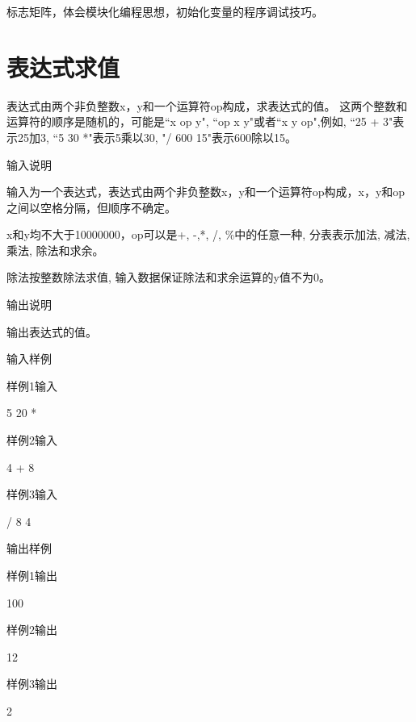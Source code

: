 \begin{note}[要点]
标志矩阵，体会模块化编程思想，初始化变量的程序调试技巧。
\end{note}

\section{表达式求值}
表达式由两个非负整数x，y和一个运算符op构成，求表达式的值。
这两个整数和运算符的顺序是随机的，可能是``x op y", ``op x y"或者``x y op",例如, ``25 + 3"表示25加3, ``5 30 *"表示5乘以30, "/ 600 15"表示600除以15。

输入说明

输入为一个表达式，表达式由两个非负整数x，y和一个运算符op构成，x，y和op之间以空格分隔，但顺序不确定。

x和y均不大于10000000，op可以是+, -,*, /, \%中的任意一种, 分表表示加法, 减法, 乘法, 除法和求余。

除法按整数除法求值, 输入数据保证除法和求余运算的y值不为0。

输出说明	

输出表达式的值。

输入样例

样例1输入

5 20 *

样例2输入

4 + 8

样例3输入

/ 8 4

输出样例

样例1输出

100

样例2输出

12

样例3输出

2

